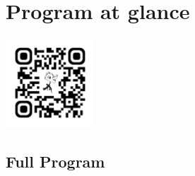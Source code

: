 \documentclass[11pt,oneside]{book}
\begin{document}
\chapter{Program at glance}
\includegraphics[width=0.25\textwidth,trim=1cm 1cm 1cm 1cm,clip]{figs/qrcode} \\
\noindent{}



\begin{landscape}
\chapter{Full Program}

\end{landscape}
\end{document}
